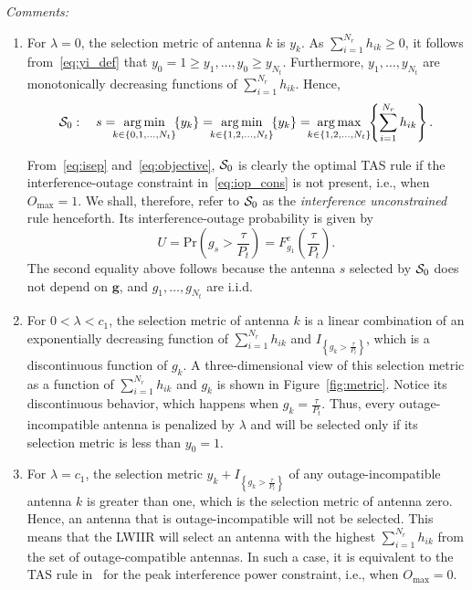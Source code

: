 \documentclass[12pt,draftcls,peerreview,onecolumn]{IEEEtran}
\newcommand{\brac}[1]{\left({#1}\right)}
\newcommand{\cbrac}[1]{\left\{{#1}\right\}}
\newcommand{\indic}[1]{I_{\cbrac{#1}}}
\newcommand{\ie}{{i.e.}}
\newcommand{\prob}[1]{\text{Pr}\brac{#1}}
\DeclareMathOperator*{\argmin}{arg\,min}
\DeclareMathOperator*{\argmax}{arg\,max}
\newcommand{\nx}{{0}}
\newcommand{\lam}{\lambda}
\newcommand{\Nt}{{N_t}}
\newcommand{\Nr}{{N_r}}
\newcommand{\Pt}{{P_t}}
\newcommand{\such}{h}
\newcommand{\puch}{g}
\newcommand{\hk}[1]{{\such_{#1}}}
\newcommand{\gk}[1]{{\puch_{#1}}}
\newcommand{\g}{\mathbf{\puch}}
\newcommand{\outmax}{O_{\text{max}}}
\newcommand{\itau}{\tau}
\newcommand{\cone}{c_{1}}
\newcommand{\taubypt}{\frac{\itau}{\Pt}}
\newcommand{\gkgrtaubypt}[1]{{\gk{#1}}>\taubypt}
\newcommand{\gindic}[1]{\indic{\gkgrtaubypt{#1}}}
\newcommand{\yk}[1]{y_{#1}}
\newcommand{\un}{U}
\newcommand{\allopts}{\left\{\nx,1,\ldots,\Nt\right\}}
\newcommand{\antopts}{\left\{1,2,\ldots,\Nt\right\}}
\newcommand{\caluncons}{{\cal S_{\text{0}}}}
\newcommand{\sumnr}{\sum_{i=1}^{\Nr}}
\begin{document}
{\em Comments:}
\begin{enumerate}
\item For $\lam=0$, the selection metric of antenna $k$ is $\yk{k}$. As $\sumnr\hk{ik}\geq 0$, it follows from~\eqref{eq:yi_def} that $\yk{0}=1\geq\yk{1},\ldots,\yk{0}\geq\yk{\Nt}$. Furthermore, $\yk{1},\ldots,\yk{\Nt}$ are monotonically decreasing functions of $\sumnr\hk{ik}$. Hence, 
\begin{equation}
\caluncons:\quad s=\!\!\!\argmin\limits_{k\in\allopts}\!\! \left\{ \yk{k} \right\} = \!\!\!\argmin\limits_{k\in\antopts}\!\! \left\{ \yk{k} \right\} = \!\!\!\argmax\limits_{k\in\antopts}\!\! \left\{\sumnr \hk{ik} \right\}.
\label{eq:uncons_simple}
\end{equation}

From~\eqref{eq:isep} and~\eqref{eq:objective}, $\caluncons$ is clearly the optimal TAS rule if the interference-outage constraint in~\eqref{eq:iop_cons} is not present, \ie, when $\outmax=1$. We shall, therefore, refer to $\caluncons$ as the {\em interference unconstrained} rule henceforth. Its interference-outage probability is given by
%
\begin{equation}
\un= \prob{\gk{s}>\taubypt}= F^c_{\gk{1}}\!\!\left({\taubypt}\right) .
\label{eq:uncomsoutage}
\end{equation}
%
The second equality above follows because the antenna $s$ selected by $\caluncons$ does not depend on $\g$, and $\gk{1},\ldots,\gk{\Nt}$ are i.i.d. 

\item For $0<\lam<\cone$, the selection metric of antenna $k$ is a linear combination of  an exponentially decreasing function of $\sumnr\hk{ik}$ and $\indic{\gkgrtaubypt{k}}$, which is a discontinuous function of $\gk{k}$. A three-dimensional view of this selection metric as a function of $\sumnr\hk{ik}$ and $\gk{k}$ is shown in Figure~\ref{fig:metric}. Notice its discontinuous behavior, which happens when $\gk{k}=\taubypt$. Thus, every outage-incompatible antenna is penalized by $\lam$ and will be selected only if its selection metric is less than $\yk{0}=1$.

\item For $\lam=\cone$, the selection metric $\yk{k}+\gindic{k}$ of any outage-incompatible antenna $k$ is greater than one, which is the selection metric of antenna zero. Hence, an antenna that is outage-incompatible will not be selected. This means that the LWIIR will select an antenna with the highest $\sumnr\hk{ik}$ from the set of outage-compatible antennas. In such a case, it is equivalent to the TAS rule in~\cite{Hanif_2015_globecom}  for the peak interference power constraint, \ie, when $\outmax=0$.


\end{enumerate}
\end{document}
